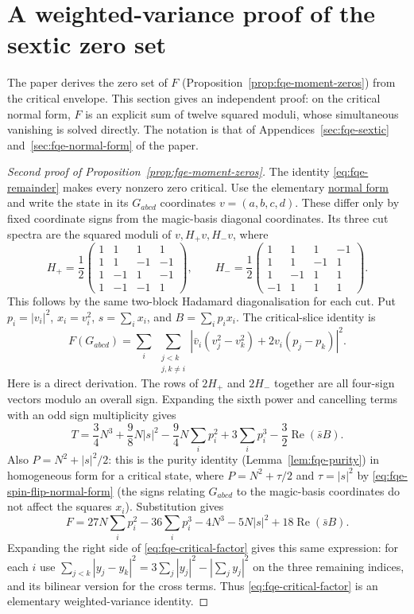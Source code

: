 \section{A weighted-variance proof of the sextic zero set}\label{sec:sup-sextic-zeros}
The paper derives the zero set of $F$ (Proposition~\ref{prop:fqe-moment-zeros}) from the critical envelope. This section
gives an independent proof: on the critical normal form, $F$ is an explicit sum of twelve squared moduli, whose
simultaneous vanishing is solved directly. The notation is that of Appendices~\ref{sec:fqe-sextic}
and~\ref{sec:fqe-normal-form} of the paper.

\begin{proof}[Second proof of Proposition~\ref{prop:fqe-moment-zeros}]
The identity \eqref{eq:fqe-remainder} makes every nonzero zero critical. Use the elementary
\hyperref[sec:fqe-normal-form]{normal form} and write the state in its \(G_{abcd}\) coordinates
\(v=(a,b,c,d)\). These differ only by fixed coordinate signs from the magic-basis diagonal
coordinates. Its three cut spectra are the squared moduli of \(v,H_+v,H_-v\), where \[
H_+=\frac12\begin{pmatrix}1&1&1&1\\1&1&-1&-1\\1&-1&1&-1\\1&-1&-1&1\end{pmatrix},\qquad
H_-=\frac12\begin{pmatrix}1&1&1&-1\\1&1&-1&1\\1&-1&1&1\\-1&1&1&1\end{pmatrix}.
\] This follows by the same two-block Hadamard diagonalisation for each cut. Put \(p_i=|v_i|^2\),
\(x_i=v_i^2\), \(s=\sum_i x_i\), and \(B=\sum_i p_ix_i\). The critical-slice identity is \[
\boxed{\quad F(G_{abcd})=
\sum_i\ \sum_{\substack{j<k\\j,k\ne i}}
\left|\bar v_i(v_j^2-v_k^2)+2v_i(p_j-p_k)\right|^2.\quad} \tag{Z}\label{eq:fqe-critical-factor}
\] Here is a direct derivation. The rows of \(2H_+\) and \(2H_-\) together are all four-sign vectors
modulo an overall sign. Expanding the sixth power and cancelling terms with an odd sign multiplicity
gives \[
T=\frac34N^3+\frac98N|s|^2-\frac94N\sum_i p_i^2
+3\sum_i p_i^3-\frac32\operatorname{Re}(\bar sB).
\] Also \(P=N^2+|s|^2/2\): this is the purity identity (Lemma~\ref{lem:fqe-purity}) in homogeneous form for a critical state, where \(P=N^2+\tau/2\) and \(\tau=|s|^2\) by \eqref{eq:fqe-spin-flip-normal-form} (the signs relating \(G_{abcd}\) to the magic-basis coordinates do not affect the squares \(x_i\)). Substitution gives \[
F=27N\sum_i p_i^2-36\sum_i p_i^3-4N^3-5N|s|^2
+18\operatorname{Re}(\bar sB).
\] Expanding the right side of \eqref{eq:fqe-critical-factor} gives this same expression: for each
\(i\) use \(\sum_{j<k}|y_j-y_k|^2=3\sum_j|y_j|^2-|\sum_j y_j|^2\) on the three remaining indices,
and its bilinear version for the cross terms. Thus \eqref{eq:fqe-critical-factor} is an elementary
weighted-variance identity.


\end{proof}
